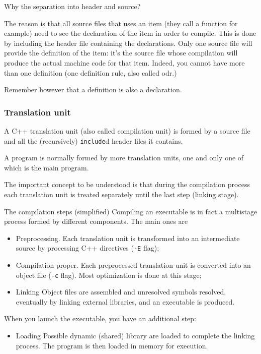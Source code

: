 \documentclass[12pt,aspectratio=169]{beamer}
\begin{document}
\begin{frame}{Why the separation into header and source?}

The reason is that all source files that uses an item (they call a function for example) need to see the \alert{declaration} of the item in order to compile. This is done by \alert{including} the header file containing the declarations.
Only one source file will provide the \alert{definition} of the item: it's the source file whose compilation will produce the actual machine code for that item. Indeed, you cannot have \alert{more than one definition} (one definition rule, also called odr.)
\medskip

Remember however that \alert{a definition is also a declaration}.
 
\end{frame}

\begin{frame}[fragile]
\frametitle{Translation unit}
A C++ \alert{translation unit} (also called compilation unit) is formed by a \alert{source file}  and all the (recursively) \texttt{include}d header files it contains.

A program is normally formed by more translation units, one and only one of which is the \alert{main program}.
\medskip

The important concept to be understood is that during the compilation process \alert{each translation unit is treated separately} until the last step (linking stage).

\end{frame}

\begin{frame}{The compilation steps (simplified)}
Compiling an executable is in fact a \alert{multistage process} formed by different components. The main ones are
\begin{itemize}
	\item \alert{Preprocessing}. Each translation unit is transformed into an intermediate source by processing C++ directives (\texttt{-E} flag);
	\item \alert{Compilation} proper. Each preprocessed translation unit is converted into an {\color{blue} object file} (\texttt{-c} flag). Most optimization is done at this stage;
	\item \alert{Linking} Object files are assembled and unresolved symbols resolved, eventually by linking external libraries, and an executable is produced.
\end{itemize}

When you launch the executable, you have an additional step:
\begin{itemize}
	\item \alert{Loading} Possible dynamic (shared) library are loaded to complete the linking process. The program is then loaded in memory for execution. 
\end{itemize}
\end{frame}
\end{document}
